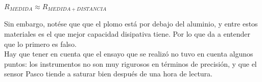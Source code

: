\documentclass[a4paper]{article}
\begin{document}
		\begin{center}
			$R_{MEDIDA} \approx R_{MEDIDA + DISTANCIA}$
		\end{center}
		
    \indent Sin embargo, notése que que el plomo está por debajo del aluminio, y entre estos materiales es el que mejor capacidad disipativa tiene. Por lo que da a entender que lo primero es falso.\\
    \indent Hay que tener en cuenta que el ensayo que se realizó no tuvo en cuenta algunos puntos: los instrumentos no son muy rigurosos en términos de precisión, y que el sensor Pasco tiende a saturar bien después de una hora de lectura. 
\end{document}

